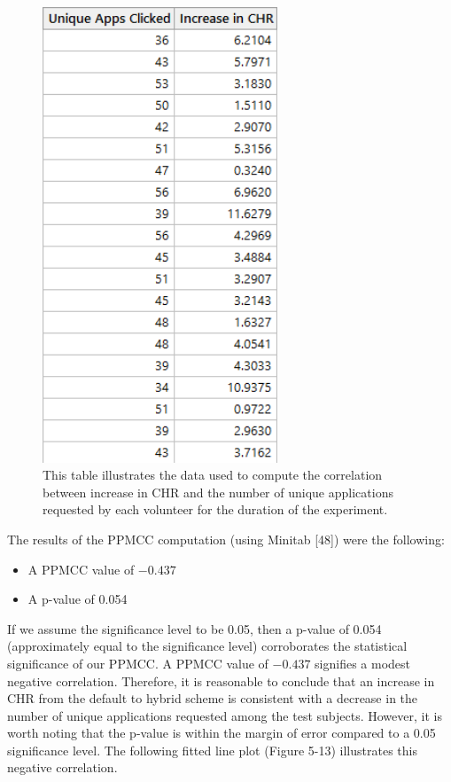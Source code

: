 \documentclass[12pt]{uthesis-v12}  %
\begin{document}
				\begin{figure}[h]
					\centering
					\includegraphics[width = 70mm]{images/uniqueAppsData.png}
					\caption[Increase in CHR vs Unique Applications Requested - Table]{This table illustrates the data used to compute the correlation between increase in CHR and the number of unique applications requested by each volunteer for the duration of the experiment.}
				\end{figure}
				
				 The results of the PPMCC computation (using Minitab [48]) were the following:
				
				\begin{itemize}
					\item A PPMCC value of $-0.437$ 
					\item A p-value of 0.054
				\end{itemize}
				
				
				If we assume the significance level to be 0.05, then a p-value of 0.054 (approximately equal to the significance level) corroborates the statistical significance of our PPMCC. A PPMCC value of $-0.437$ signifies a modest negative correlation. Therefore, it is reasonable to conclude that an increase in CHR from the default to hybrid scheme is consistent with a decrease in the number of unique applications requested among the test subjects. However, it is worth noting that the p-value is within the margin of error compared to a 0.05 significance level. The following fitted line plot (Figure 5-13) illustrates this negative correlation.
				
\end{document}
